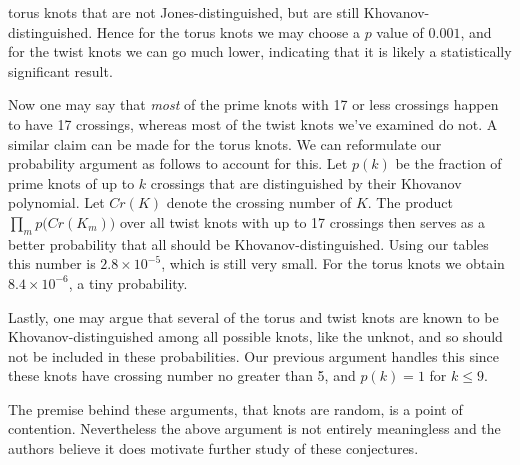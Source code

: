 \documentclass{article}
\theoremstyle{plain}
\begin{document}
        torus knots that are not Jones-distinguished, but are still
        Khovanov-distinguished. Hence for the torus knots we may choose a $p$
        value of $0.001$, and for the twist knots we can go much lower, indicating
        that it is likely a statistically significant result.
        \par\hfill\par
        Now one may say that \textit{most} of the prime knots with 17 or less
        crossings happen to have 17 crossings, whereas most of the twist knots
        we've examined do not.
        A similar claim can be made for the torus knots. We can reformulate
        our probability argument as follows to account for this. Let
        $p(k)$ be the fraction of prime knots of up to $k$ crossings that are
        distinguished by their Khovanov polynomial. Let
        $Cr(K)$ denote the crossing number of $K$. The product
        $\prod_{m}p\big(Cr(K_{m})\big)$ over all twist knots with up to 17 crossings
        then serves as a better probability that all should be
        Khovanov-distinguished. Using our tables this number is
        $2.8\times{10}^{-5}$, which is still very small. For the torus
        knots we obtain $8.4\times{10}^{-6}$, a tiny probability.
        \par\hfill\par
        Lastly, one may argue that several of the torus and twist knots are known
        to be Khovanov-distinguished among all possible knots, like the unknot,
        and so should not be included in these probabilities.
        Our previous argument handles this since these knots have
        crossing number no greater than 5, and $p(k)=1$ for $k\leq{9}$.
        \par\hfill\par
        The premise behind these arguments, that knots are random, is a point of
        contention. Nevertheless the above argument is not entirely meaningless
        and the authors believe it does motivate further study of these conjectures.
\end{document}
